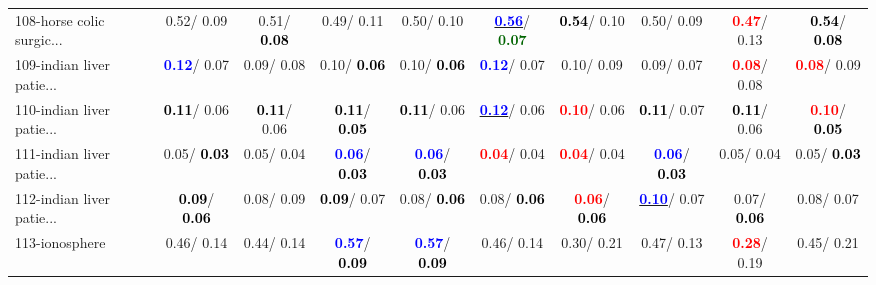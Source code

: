 \begin{table}[h]
\begin{center}
{\begin{tabular}{lc|c|c|c|c|c|c|c|c}
108-horse colic surgic... &   0.52/  0.09 &   0.51/\textcolor{black}{\textbf{  0.08}} &   0.49/  0.11 &   0.50/  0.10 & \underline{\textcolor{blue}{\textbf{  0.56}}}/\textcolor{darkgreen}{\textbf{  0.07}} & \textcolor{black}{\textbf{  0.54}}/  0.10 &   0.50/  0.09 & \textcolor{red}{\textbf{  0.47}}/  0.13 & \textcolor{black}{\textbf{  0.54}}/\textcolor{black}{\textbf{  0.08}} \\
109-indian liver patie... & \textcolor{blue}{\textbf{  0.12}}/  0.07 &   0.09/  0.08 &   0.10/\textcolor{black}{\textbf{  0.06}} &   0.10/\textcolor{black}{\textbf{  0.06}} & \textcolor{blue}{\textbf{  0.12}}/  0.07 &   0.10/  0.09 &   0.09/  0.07 & \textcolor{red}{\textbf{  0.08}}/  0.08 & \textcolor{red}{\textbf{  0.08}}/  0.09 \\
110-indian liver patie... & \textcolor{black}{\textbf{  0.11}}/  0.06 & \textcolor{black}{\textbf{  0.11}}/  0.06 & \textcolor{black}{\textbf{  0.11}}/\textcolor{black}{\textbf{  0.05}} & \textcolor{black}{\textbf{  0.11}}/  0.06 & \underline{\textcolor{blue}{\textbf{  0.12}}}/  0.06 & \textcolor{red}{\textbf{  0.10}}/  0.06 & \textcolor{black}{\textbf{  0.11}}/  0.07 & \textcolor{black}{\textbf{  0.11}}/  0.06 & \textcolor{red}{\textbf{  0.10}}/\textcolor{black}{\textbf{  0.05}} \\ \hline
111-indian liver patie... &   0.05/\textcolor{black}{\textbf{  0.03}} &   0.05/  0.04 & \textcolor{blue}{\textbf{  0.06}}/\textcolor{black}{\textbf{  0.03}} & \textcolor{blue}{\textbf{  0.06}}/\textcolor{black}{\textbf{  0.03}} & \textcolor{red}{\textbf{  0.04}}/  0.04 & \textcolor{red}{\textbf{  0.04}}/  0.04 & \textcolor{blue}{\textbf{  0.06}}/\textcolor{black}{\textbf{  0.03}} &   0.05/  0.04 &   0.05/\textcolor{black}{\textbf{  0.03}} \\
112-indian liver patie... & \textcolor{black}{\textbf{  0.09}}/\textcolor{black}{\textbf{  0.06}} &   0.08/  0.09 & \textcolor{black}{\textbf{  0.09}}/  0.07 &   0.08/\textcolor{black}{\textbf{  0.06}} &   0.08/\textcolor{black}{\textbf{  0.06}} & \textcolor{red}{\textbf{  0.06}}/\textcolor{black}{\textbf{  0.06}} & \underline{\textcolor{blue}{\textbf{  0.10}}}/  0.07 &   0.07/\textcolor{black}{\textbf{  0.06}} &   0.08/  0.07 \\
113-ionosphere &   0.46/  0.14 &   0.44/  0.14 & \textcolor{blue}{\textbf{  0.57}}/\textcolor{black}{\textbf{  0.09}} & \textcolor{blue}{\textbf{  0.57}}/\textcolor{black}{\textbf{  0.09}} &   0.46/  0.14 &   0.30/  0.21 &   0.47/  0.13 & \textcolor{red}{\textbf{  0.28}}/  0.19 &   0.45/  0.21 \\

\end{tabular}}
\end{center}
\end{table}
